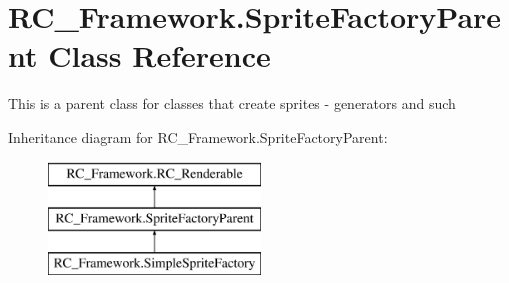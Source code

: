 \hypertarget{class_r_c___framework_1_1_sprite_factory_parent}{}\section{R\+C\+\_\+\+Framework.\+Sprite\+Factory\+Parent Class Reference}
\label{class_r_c___framework_1_1_sprite_factory_parent}


This is a parent class for classes that create sprites -\/ generators and such  


Inheritance diagram for R\+C\+\_\+\+Framework.\+Sprite\+Factory\+Parent\+:\begin{figure}[H]
\begin{center}
\leavevmode
\includegraphics[height=3.000000cm]{class_r_c___framework_1_1_sprite_factory_parent}
\end{center}
\end{figure}
